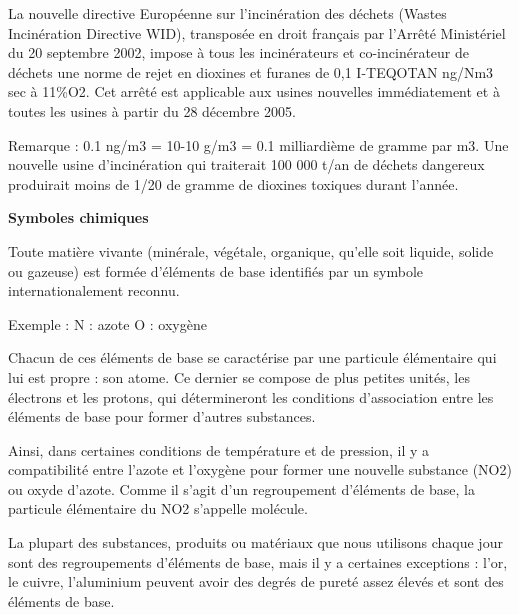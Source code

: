 La nouvelle directive Européenne sur l’incinération des déchets (Wastes Incinération Directive WID), transposée en droit français par l’Arrêté Ministériel du 20 septembre 2002, impose à tous les incinérateurs et co-incinérateur de déchets une norme de rejet en dioxines et furanes de 0,1 I-TEQOTAN ng/Nm3 sec à 11\%O2.
Cet arrêté est applicable aux usines nouvelles immédiatement et à toutes les usines à partir du 28 décembre 2005.
\vspace{0.3cm}

Remarque : 0.1 ng/m3 = 10-10 g/m3 = 0.1 milliardième de gramme par m3. Une nouvelle usine d’incinération qui traiterait 100 000 t/an de déchets dangereux produirait moins de 1/20 de gramme de dioxines toxiques durant l’année.
 


\vspace{0.3cm}

\textbf{Symboles chimiques}
\vspace{0.3cm}

Toute matière vivante (minérale, végétale, organique, qu'elle soit liquide, solide ou gazeuse) est formée d'éléments de base identifiés par un symbole internationalement reconnu.

\vspace{0.3cm}

Exemple :	N : azote		O : oxygène

\vspace{0.3cm}

Chacun de ces éléments de base se caractérise par une particule élémentaire qui lui est propre : son atome. Ce dernier se compose de plus petites unités, les électrons et les protons, qui détermineront les conditions d’association entre les éléments de base pour former d’autres substances.
\vspace{0.3cm}

Ainsi, dans certaines conditions de température et de pression, il y a compatibilité entre l’azote et l’oxygène pour former une nouvelle substance (NO2) ou oxyde d’azote. Comme il s’agit d’un regroupement d’éléments de base, la particule élémentaire du NO2 s’appelle molécule.
\vspace{0.3cm}

La plupart des substances, produits ou matériaux que nous utilisons chaque jour sont des regroupements d’éléments de base, mais il y a certaines exceptions : l’or, le cuivre, l’aluminium peuvent avoir des degrés de pureté assez élevés et sont des éléments de base.